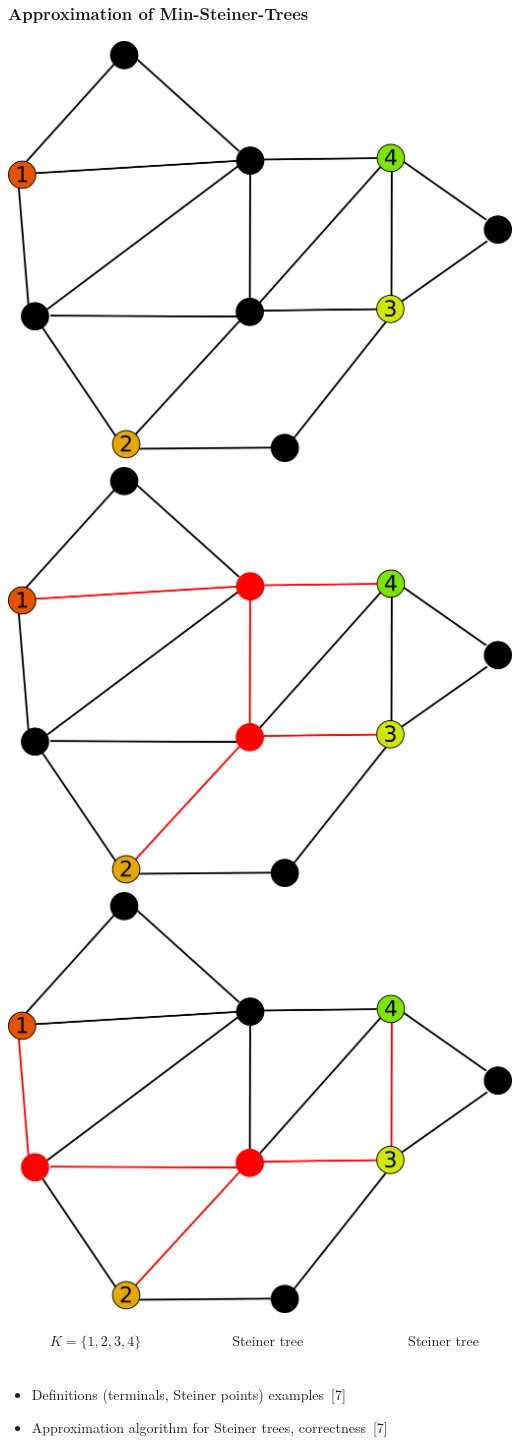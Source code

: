 \documentclass[titlepage,german,presentation]{beamer}
\begin{document}
\begin{frame}
\frametitle{Approximation of Min-Steiner-Trees}

\begin{center}
\includegraphics[height=0.22\textwidth]{stree-1.png}\qquad
\includegraphics[height=0.22\textwidth]{stree-2.png}\qquad
\includegraphics[height=0.22\textwidth]{stree-3.png}

\end{center}
~~~~~~$K = \{1, 2, 3, 4\}$~~~~~~~~~~~~~Steiner tree~~~~~~~~~~~~~~~Steiner tree\\
~\\
\begin{itemize}
\item Definitions (terminals, Steiner points) examples~[7]
\medskip
\item Approximation algorithm for Steiner trees, correctness~[7]
\end{itemize}

\end{frame}
  
\end{document}
